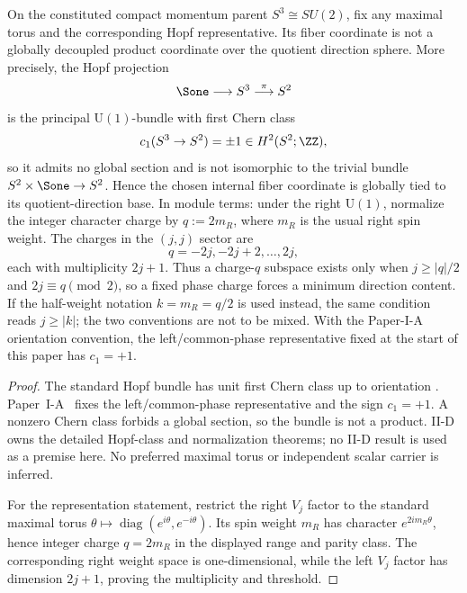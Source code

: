\documentclass[11pt,a4paper]{article}
\begin{document}
\begin{proposition}
\label{p2:prop:hopf-phase-direction-coupling}
On the constituted compact momentum parent \(S^3\cong SU(2)\), fix any
maximal torus and the corresponding Hopf representative.  Its fiber coordinate
is not a globally decoupled product coordinate over the quotient direction
sphere.  More precisely, the Hopf projection
\[
\Sone\longrightarrow S^3\overset{\pi}{\longrightarrow}S^2
\]
is the principal \(\mathrm U(1)\)-bundle with first Chern class
\[
c_1(S^3\to S^2)=\pm1\in H^2(S^2;\ZZ),
\]
so it admits no global section and is not isomorphic to the trivial bundle
\(S^2\times \Sone\to S^2\).  Hence the chosen internal fiber coordinate is
globally tied to its quotient-direction base.  In module terms: under the right
\(\mathrm U(1)\), normalize the integer character charge by
\(q:=2m_R\), where \(m_R\) is the usual right spin weight.  The charges in
the \((j,j)\) sector are
\[
 q=-2j,-2j+2,\ldots,2j,
\]
each with multiplicity \(2j+1\).  Thus a charge-\(q\) subspace exists only
when \(j\ge|q|/2\) and \(2j\equiv q\pmod2\), so a fixed phase charge forces
a minimum direction content.  If the half-weight notation \(k=m_R=q/2\) is
used instead, the same condition reads \(j\ge|k|\); the two conventions are
not to be mixed.  With the Paper-I-A orientation convention, the left/common-phase representative
fixed at the start of this paper has \(c_1=+1\).
\end{proposition}

\begin{proof}
The standard Hopf bundle has unit first Chern class up to orientation
\cite{hopf1931abbildung,steenrod1951topology}.
Paper~I-A~\cite{Kugelmann2026a} fixes the left/common-phase representative and
the sign \(c_1=+1\).  A nonzero Chern class forbids a global section, so the
bundle is not a product.  II-D owns the detailed Hopf-class and normalization
theorems; no II-D result is used as a premise here.  No preferred maximal
torus or independent scalar carrier is inferred.

For the representation statement, restrict the right \(V_j\) factor to the
standard maximal torus
\(\theta\mapsto\operatorname{diag}(e^{i\theta},e^{-i\theta})\).  Its spin
weight \(m_R\) has character \(e^{2im_R\theta}\), hence integer charge
\(q=2m_R\) in the displayed range and parity class.  The corresponding right
weight space is one-dimensional, while the left \(V_j\) factor has dimension
\(2j+1\), proving the multiplicity and threshold.
\end{proof}
\end{document}
